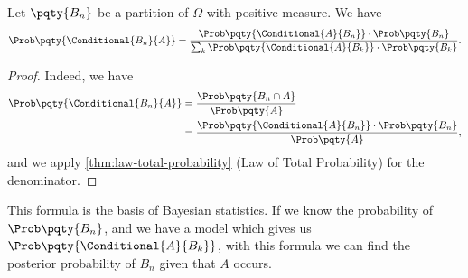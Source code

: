 \begin{theorem}
    \label{thm:bayes}%
    Let \(\pqty{B_n}\) be a partition of \(\Omega\) with positive measure. We have
    \[
        \Prob\pqty{\Conditional{B_n}{A}} = \frac{\Prob\pqty{\Conditional{A}{B_n}} \cdot \Prob\pqty{B_n}}{\sum_{k} \Prob\pqty{\Conditional{A}{B_k}} \cdot \Prob\pqty{B_k}}.
    \]
\end{theorem}

\begin{proof}
    Indeed, we have
    \begin{align*}
        \Prob\pqty{\Conditional{B_n}{A}} &= \frac{\Prob\pqty{B_n \cap A}}{\Prob\pqty{A}} \\
        &= \frac{\Prob\pqty{\Conditional{A}{B_n}} \cdot \Prob\pqty{B_n}}{\Prob\pqty{A}},
    \end{align*}
    and we apply \autoref{thm:law-total-probability} (Law of Total Probability) for the denominator.
\end{proof}

This formula is the basis of Bayesian statistics. If we know the probability of \(\Prob\pqty{B_n}\), and we have a model which gives us \(\Prob\pqty{\Conditional{A}{B_k}}\), with this formula we can find the posterior probability of \(B_n\) given that \(A\) occurs.

